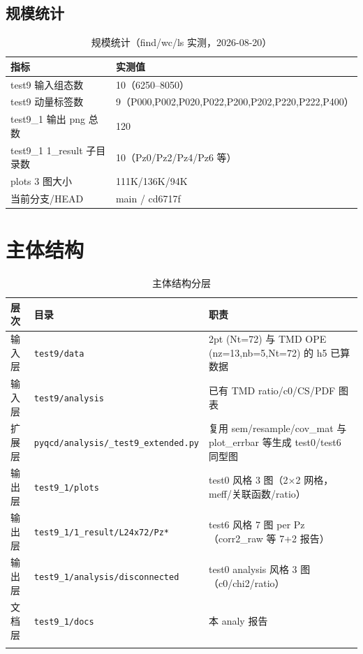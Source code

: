 \documentclass[UTF8]{ctexart}
\begin{document}
\subsection{规模统计}
\begin{table}[htbp]\centering
\begin{tabular}{ll}
\toprule
指标 & 实测值 \\
\midrule
test9 输入组态数 & 10（6250–8050） \\
test9 动量标签数 & 9（P000,P002,P020,P022,P200,P202,P220,P222,P400） \\
test9\_1 输出 png 总数 & 120 \\
test9\_1 1\_result 子目录数 & 10（Pz0/Pz2/Pz4/Pz6 等） \\
plots 3 图大小 & 111K/136K/94K \\
当前分支/HEAD & main / cd6717f \\
\bottomrule
\end{tabular}
\caption{规模统计（find/wc/ls 实测，2026-08-20）}
\end{table}

\section{主体结构}
\begin{xltabular}{\textwidth}{llX}
\toprule
\textcolor{struct}{层次} & 目录 & \textcolor{struct}{职责} \\
\midrule
\endhead
输入层 & \texttt{\nolinkurl{test9/data}} & 2pt (Nt=72) 与 TMD OPE (nz=13,nb=5,Nt=72) 的 h5 已算数据 \\
输入层 & \texttt{\nolinkurl{test9/analysis}} & 已有 TMD ratio/c0/CS/PDF 图表 \\
扩展层 & \texttt{pyqcd/analysis/\_test9\_extended.py} & 复用 sem/resample/cov\_mat 与 plot\_errbar 等生成 test0/test6 同型图 \\
输出层 & \texttt{test9\_1/plots} & test0 风格 3 图（2×2 网格，meff/关联函数/ratio） \\
输出层 & \texttt{test9\_1/1\_result/L24x72/Pz*} & test6 风格 7 图 per Pz（corr2\_raw 等 7+2 报告） \\
输出层 & \texttt{test9\_1/analysis/disconnected} & test0 analysis 风格 3 图（c0/chi2/ratio） \\
文档层 & \texttt{test9\_1/docs} & 本 analy 报告 \\
\bottomrule
\caption{主体结构分层}
\end{xltabular}

\end{document}

